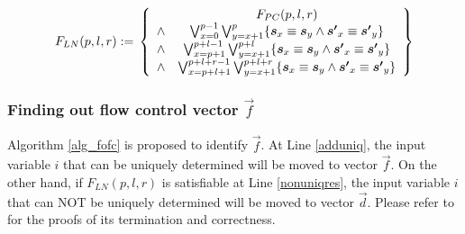 \documentclass[runningheads,a4paper,orivec]{llncs}
\begin{document}
\begin{equation}\label{uniqln}
F_{LN}(p,l,r):=\\
\left\{
\begin{array}{cc}
&F_{PC}(p,l,r)\\
\wedge&\bigvee_{x=0}^{p-1}\bigvee_{y=x+1}^{p} \{\vec{s}_x\equiv \vec{s}_y\wedge \vec{s'}_x\equiv \vec{s'}_y\} \\
\wedge&\bigvee_{x=p+1}^{p+l-1}\bigvee_{y=x+1}^{p+l} \{\vec{s}_x\equiv \vec{s}_y\wedge \vec{s'}_x\equiv \vec{s'}_y\} \\
\wedge&\bigvee_{x=p+l+1}^{p+l+r-1}\bigvee_{y=x+1}^{p+l+r} \{\vec{s}_x\equiv \vec{s}_y\wedge \vec{s'}_x\equiv \vec{s'}_y\}
\end{array}
\right\}
\end{equation}



% 
% 

\subsubsection{Finding out flow control vector $\vec{f}$}\label{subsubsec_findfc}
% 
Algorithm \ref{alg_fofc} is proposed to identify $\vec{f}$.
At Line \ref{adduniq},
the input variable $i$ that can be uniquely determined will be moved to vector $\vec{f}$.
On the other hand,
if $F_{LN}(p,l,r)$ is satisfiable at Line \ref{nonuniqres},
the input variable $i$ that can NOT be uniquely determined will be moved to vector $\vec{d}$.
Please refer to \cite{QinTODAES15} for the proofs of its termination and correctness.
\end{document}
